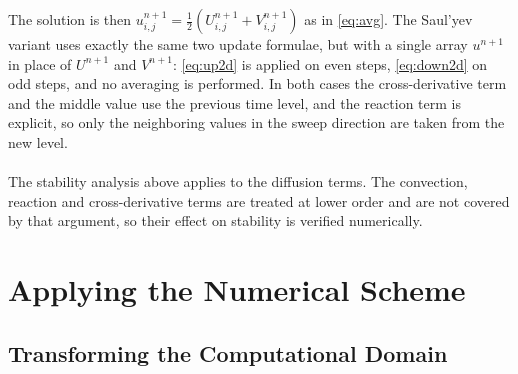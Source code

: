 \documentclass[12pt,a4paper]{article}
\begin{document}
The solution is then $u^{n+1}_{i,j}=\tfrac12(U^{n+1}_{i,j}+V^{n+1}_{i,j})$ as in \eqref{eq:avg}. The Saul'yev variant uses exactly the same two update formulae, but with a single array $u^{n+1}$ in place of $U^{n+1}$ and $V^{n+1}$: \eqref{eq:up2d} is applied on even steps, \eqref{eq:down2d} on odd steps, and no averaging is performed. In both cases the cross-derivative term and the middle value use the previous time level, and the reaction term is explicit, so only the neighboring values in the sweep direction are taken from the new level.\\\\
The stability analysis above applies to the diffusion terms. The convection, reaction and cross-derivative terms are treated at lower order and are not covered by that argument, so their effect on stability is verified numerically.

\newpage

\section{Applying the Numerical Scheme}\label{ch:apply}

\subsection{Transforming the Computational Domain}
\end{document}
